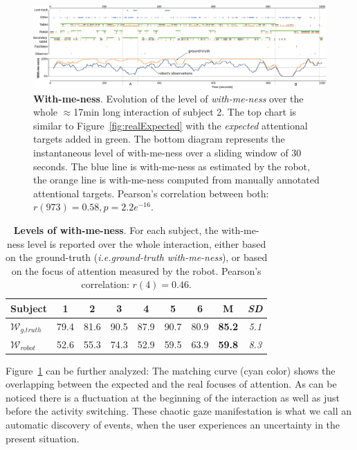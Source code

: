 \documentclass{sig-alternate}
\newcommand{\ie}{\textit{i.e.}\xspace}
\begin{document}
\begin{figure}
    \centering
    \includegraphics[width=\linewidth]{with-me-ness}
    \caption{\small \textbf{With-me-ness}. Evolution of the level of
        \emph{with-me-ness} over the whole $\approx$17min long interaction of
        subject 2. The top chart is similar to Figure~\ref{fig:realExpected}
        with the \emph{expected} attentional targets added in green. The bottom
        diagram represents the instantaneous level of with-me-ness over a
        sliding window of 30 seconds. The blue line is with-me-ness as estimated
        by the robot, the orange line is with-me-ness computed from manually
        annotated attentional targets.  Pearson's correlation between both: $r(973)=0.58, p =
        2.2e^{-16}.$}

    \label{fig:with-me-ness}
\end{figure}


\begin{table}[h!]
    \centering
    \caption{\textbf{Levels of with-me-ness}. For each subject, the with-me-ness
    level is reported over the whole interaction, either based on the
    ground-truth (\ie \emph{ground-truth with-me-ness}), or based on the focus of
    attention measured by the robot. Pearson's correlation: $r(4)=0.46$.}

    \begin{tabular}{p{1cm}cccccccc}
        \toprule
        Subject & 1 & 2 & 3 & 4 & 5 & 6 & {\bf M} & {\it SD} \\
        \midrule
        $\mathcal{W}_{g.truth}$ & 79.4 & 81.6  & 90.5 & 87.9 & 90.7 & 80.9 & {\bf 85.2} & {\it 5.1} \\ 
        $\mathcal{W}_{robot}$ & 52.6 & 55.3 & 74.3 & 52.9 & 59.5 & 63.9 & {\bf 59.8} & {\it 8.3} \\
        \bottomrule
    \end{tabular}
    \label{tab:results-with-me-ness}
\end{table}

Figure~\ref{fig:with-me-ness} can be further analyzed:
The matching curve (cyan color) shows the overlapping between the
expected and the real focuses of attention. As can be noticed there is a
fluctuation at the beginning of the interaction as well as just before the
activity switching. These chaotic gaze manifestation is what we call an
automatic discovery of events, when the user experiences an uncertainty in the
present situation. 
\end{document}
